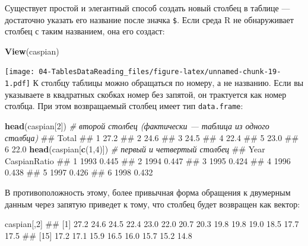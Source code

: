 \documentclass[]{book}
\newenvironment{Shaded}{\begin{snugshade}}{\end{snugshade}}
\newcommand{\KeywordTok}[1]{\textcolor[rgb]{0.13,0.29,0.53}{\textbf{#1}}}
\newcommand{\DecValTok}[1]{\textcolor[rgb]{0.00,0.00,0.81}{#1}}
\newcommand{\StringTok}[1]{\textcolor[rgb]{0.31,0.60,0.02}{#1}}
\newcommand{\CommentTok}[1]{\textcolor[rgb]{0.56,0.35,0.01}{\textit{#1}}}
\newcommand{\OperatorTok}[1]{\textcolor[rgb]{0.81,0.36,0.00}{\textbf{#1}}}
\newcommand{\NormalTok}[1]{#1}
\begin{document}
Существует простой и элегантный способ создать новый столбец в таблице
--- достаточно указать его название после значка \texttt{\$}. Если среда
R не обнаруживает столбец с таким названием, она его создаст:

\begin{Shaded}
\end{Shaded}

\begin{Shaded}
\begin{Highlighting}[]
\KeywordTok{View}\NormalTok{(caspian)}
\end{Highlighting}
\end{Shaded}

\texttt{[image: 04-TablesDataReading\_files/figure-latex/unnamed-chunk-19-1.pdf]}
К столбцу таблицы можно обращаться по номеру, а не названию. Если вы
указываете в квадратных скобках номер без запятой, он трактуется как
номер столбца. При этом возвращаемый столбец имеет тип
\texttt{data.frame}:

\begin{Shaded}
\begin{Highlighting}[]
\KeywordTok{head}\NormalTok{(caspian[}\DecValTok{2}\NormalTok{])  }\CommentTok{# второй столбец (фактически — таблица из одного столбца)}
\NormalTok{##   Total}
\NormalTok{## 1  27.2}
\NormalTok{## 2  24.6}
\NormalTok{## 3  24.5}
\NormalTok{## 4  22.4}
\NormalTok{## 5  23.0}
\NormalTok{## 6  22.0}
\KeywordTok{head}\NormalTok{(caspian[}\KeywordTok{c}\NormalTok{(}\DecValTok{1}\NormalTok{,}\DecValTok{4}\NormalTok{)])  }\CommentTok{# первый и четвертый столбец}
\NormalTok{##   Year CaspianRatio}
\NormalTok{## 1 1993        0.445}
\NormalTok{## 2 1994        0.447}
\NormalTok{## 3 1995        0.424}
\NormalTok{## 4 1996        0.438}
\NormalTok{## 5 1997        0.426}
\NormalTok{## 6 1998        0.432}
\end{Highlighting}
\end{Shaded}

В противоположность этому, более привычная форма обращения к двумерным
данным через запятую приведет к тому, что столбец будет возвращен как
вектор:

\begin{Shaded}
\begin{Highlighting}[]
\NormalTok{caspian[,}\DecValTok{2}\NormalTok{]}
\NormalTok{##  [1] 27.2 24.6 24.5 22.4 23.0 22.0 20.7 20.3 19.8 19.8 19.0 18.5 17.7 17.5}
\NormalTok{## [15] 17.2 17.1 15.9 16.5 16.0 15.7 15.2 14.8}
\end{Highlighting}
\end{Shaded}
\end{document}
